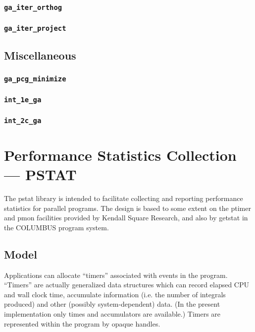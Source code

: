 \subsubsection{{\tt ga\_iter\_orthog}}

\subsubsection{{\tt ga\_iter\_project}}

\subsection{Miscellaneous}

\subsubsection{{\tt ga\_pcg\_minimize}}

\subsubsection{{\tt int\_1e\_ga}}

\subsubsection{{\tt int\_2c\_ga}}


 

\section{Performance Statistics Collection --- PSTAT}

The pstat library is intended to facilitate collecting and reporting
performance statistics for parallel programs.  The design is based to
some extent on the ptimer and pmon facilities provided by Kendall
Square Research, and also by getstat in the COLUMBUS program system.

\subsection{Model}

Applications can allocate ``timers'' associated with events in the
program.  ``Timers'' are actually generalized data structures which
can record elapsed CPU and wall clock time, accumulate information
(i.e. the number of integrals produced) and other (possibly
system-dependent) data. (In the present implementation only times and
accumulators are available.)  Timers are represented within the
program by opaque handles.

